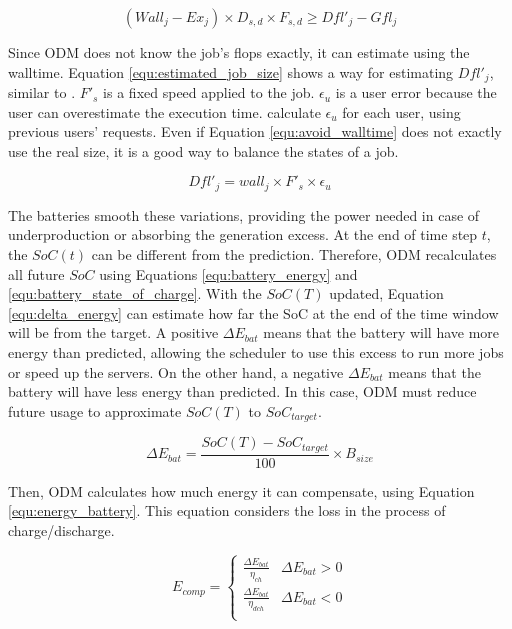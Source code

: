 \begin{equation}
    (Wall_j - Ex_j) \times D_{s,d} \times F_{s,d} \ge Dfl'_j - Gfl_j
    \label{equ:avoid_walltime}
\end{equation}

Since ODM does not know the job's flops exactly, it can estimate using the walltime. Equation \ref{equ:estimated_job_size} shows a way for estimating $Dfl'_j$, similar to \cite{takizawa2020effect}. $F'_{s}$ is a fixed speed applied to the job. $\epsilon_{u}$ is a user error because the user can overestimate the execution time. \citeauthor{takizawa2020effect} calculate $\epsilon_{u}$ for each user, using previous users' requests. Even if Equation \ref{equ:avoid_walltime} does not exactly use the real size, it is a good way to balance the states of a job.

\begin{equation}
    \label{equ:estimated_job_size}
    Dfl'_j = wall_j \times F'_{s} \times \epsilon_{u}
\end{equation}

The batteries smooth these variations, providing the power needed in case of underproduction or absorbing the generation excess. At the end of time step $t$, the $SoC(t)$ can be different from the prediction. Therefore, ODM recalculates all future $SoC$ using Equations \ref{equ:battery_energy} and \ref{equ:battery_state_of_charge}. With the $SoC(T)$ updated, Equation \ref{equ:delta_energy} can estimate how far the SoC at the end of the time window will be from the target. A positive $\Delta E_{bat}$ means that the battery will have more energy than predicted, allowing the scheduler to use this excess to run more jobs or speed up the servers. On the other hand, a negative $\Delta E_{bat}$ means that the battery will have less energy than predicted. In this case, ODM must reduce future usage to approximate $SoC(T)$ to $SoC_{target}$.

\begin{equation}
    \label{equ:delta_energy}
    \Delta E_{bat} = \frac{SoC(T) - SoC_{target}}{100}\times B_{size}
\end{equation}

Then, ODM calculates how much energy it can compensate, using Equation \ref{equ:energy_battery}. This equation considers the loss in the process of charge/discharge. 

\begin{equation}
    \label{equ:energy_battery}
    E_{comp} = \begin{cases}
        \frac{\Delta E_{bat}}{\eta_{ch}} & \Delta E_{bat} > 0 \\
        \frac{\Delta E_{bat}}{\eta_{dch}} & \Delta E_{bat} < 0 \\
    \end{cases}
\end{equation}

